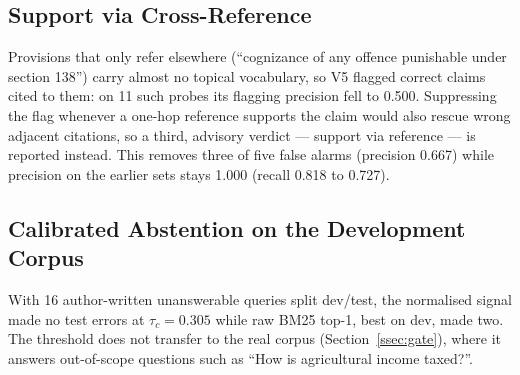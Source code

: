 \documentclass[conference]{IEEEtran}
\begin{document}
\subsection{Support via Cross-Reference}

Provisions that only refer elsewhere (``cognizance of any offence punishable under section 138'') carry almost no topical vocabulary, so V5 flagged correct claims cited to them: on 11 such probes its flagging precision fell to 0.500. Suppressing the flag whenever a one-hop reference supports the claim would also rescue wrong adjacent citations, so a third, advisory verdict --- support via reference --- is reported instead. This removes three of five false alarms (precision 0.667) while precision on the earlier sets stays 1.000 (recall 0.818 to 0.727).

\subsection{Calibrated Abstention on the Development Corpus}

With 16 author-written unanswerable queries split dev/test, the normalised signal made no test errors at $\tau_c = 0.305$ while raw BM25 top-1, best on dev, made two. The threshold does not transfer to the real corpus (Section~\ref{ssec:gate}), where it answers out-of-scope questions such as ``How is agricultural income taxed?''.
\end{document}
